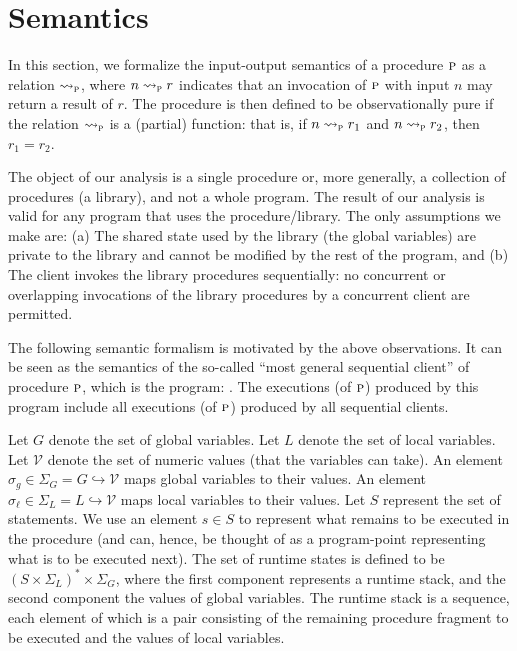 
\newcommand{\vals}{\mathcal{V}}
\newcommand{\gvars}{G}
\newcommand{\lvars}{L}
\newcommand{\gmap}{\sigma_g}
\newcommand{\gmaps}{\Sigma_G}
\newcommand{\lstate}{\sigma_\ell}
\newcommand{\lstates}{\Sigma_L}
\newcommand{\cstates}{S}
\newcommand{\cont}{s}


\newcommand{\iosem}[1]{\rightsquigarrow_{#1}}
\newcommand{\sssem}[1]{\rightarrow_{#1}}

\section{Semantics}

In this section, we formalize the input-output semantics of a procedure $\textsc{p}$ as a relation $\iosem{\proc}$,
where $n \iosem{\proc} r$ indicates that an invocation of $\textsc{p}$ with input $n$ may return a result of $r$.
The procedure is then defined to be observationally pure if the relation $\iosem{\proc}$ is a (partial) function:
that is, if  $n \iosem{\proc} r_1$ and $n \iosem{\proc} r_2$, then $r_1 = r_2$.

The object of our analysis is a single procedure or, more generally, a collection of procedures (a library),
and not a whole program. The result of our analysis is valid for any program that uses the procedure/library.
The only assumptions we make are: (a) The shared state used by the library (the global variables) are private
to the library and cannot be modified by the rest of the program, and (b) The client invokes the library
procedures sequentially: no concurrent or overlapping invocations of the library procedures by a concurrent
client are permitted.

The following semantic formalism is motivated by the above observations. It can be seen as the semantics
of the so-called ``most general sequential client'' of procedure $\textsc{p}$, which is the program:
.
The executions (of $\textsc{p}$) produced by this program include all executions (of $\textsc{p}$)  produced by all
sequential clients.

Let $\gvars$ denote the set of global variables. Let $\lvars$ denote the set of local variables.
Let $\vals$ denote the set of numeric values (that the variables can take).
An element $\gmap \in \gmaps = \gvars \hookrightarrow \vals$ maps global variables to their values.
An element $\lstate \in \lstates = \lvars \hookrightarrow \vals$ maps local variables to their values.
Let $\cstates$ represent the set of statements. We use an element $\cont \in \cstates$ to represent
what remains to be executed in the procedure (and can, hence, be thought of as a program-point
representing what is to be executed next).
The set of runtime states is defined to be $(\cstates \times \lstates)^* \times \gmaps$, where
the first component represents a runtime stack, and the second component the values of global
variables. The runtime stack is a sequence, each element of which is a pair consisting of the
remaining procedure fragment to be executed and the values of local variables.

